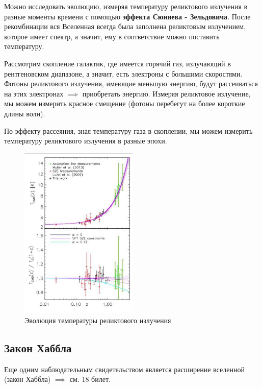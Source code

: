  Можно исследовать эволюцию, измеряя температуру реликтового излучения в разные моменты времени с помощью \textbf{эффекта Сюняева - Зельдовича}.
 После рекомбинации вся Вселенная всегда была заполнена реликтовым излучением, которое имеет спектр, а значит, ему в соответствие можно поставить температуру.
 
 Рассмотрим скопление галактик, где имеется горячий газ, излучающий в рентгеновском диапазоне, а значит, есть электроны с большими скоростями. Фотоны реликтового излучения, имеющие меньшую энергию, будут рассеиваться на этих электронах $\implies$ приобретать энергию. Измеряя реликтовое излучение, мы можем измерить красное смещение (фотоны перебегут на более короткие длины волн). 
 
 По эффекту рассеяния, зная температуру газа в скоплении, мы можем измерить температуру реликтового излучения в разные эпохи.
 
 \begin{figure}
  \centering
    \includegraphics[width=0.5\textwidth]{Pictures/19_imdone.png}
  \caption{Эволюция температуры реликтового излучения}
  \label{fig:19_done}
 \end{figure}
 
 \subsection{Закон Хаббла}
 
 Еще одним наблюдательным свидетельством является расширение вселенной (закон Хаббла) $\implies$ см. 18 билет.